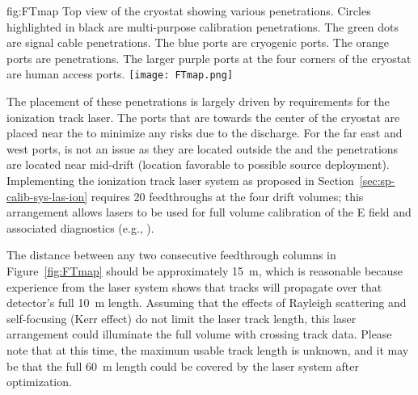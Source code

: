 
\begin{dunefigure}{fig:FTmap}
{Top view of the \spmod %
cryostat showing various penetrations. Circles highlighted in black are multi-purpose calibration penetrations. The green dots are  signal cable penetrations. The blue ports are cryogenic ports. The orange ports are  penetrations. The larger purple ports at the four corners of the cryostat are human access ports.}
\texttt{[image: FTmap.png]}
\end{dunefigure}





The placement of these penetrations is largely driven by requirements for the ionization track laser. %
The ports that are %
towards the center of the cryostat are placed near the  to minimize any risks due to the  discharge. For the far east and west ports,  is not an issue as they are located outside the  and the penetrations are located near mid-drift (location favorable to possible source deployment).
Implementing the ionization track laser system as proposed in Section~\ref{sec:sp-calib-sys-las-ion} requires \num{20} feedthroughs at the four  drift volumes; this arrangement allows lasers to be used for full volume calibration of the E field and associated diagnostics (e.g., ). 

The distance between any two consecutive feedthrough columns in Figure~\ref{fig:FTmap} should be approximately \SI{15}{\m}, which is reasonable because experience from the \microboone laser system shows that tracks will propagate over that detector's full \SI{10}{\m} length. Assuming that the effects of Rayleigh scattering and self-focusing (Kerr effect) do not limit the laser track length, this laser arrangement could illuminate the full volume with crossing track data.  Please note that at this time, the maximum usable track length is unknown, and it may be that the full \SI{60}{\m} \detmodule length could be covered by the laser system after optimization.


